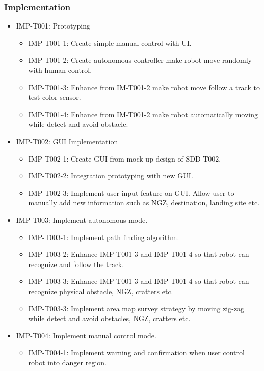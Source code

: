 	\subsubsection{Implementation}
	\begin{itemize}
		\item IMP-T001: Prototyping
		\begin{itemize}
				\item IMP-T001-1: Create simple manual control with UI.				
				\item IMP-T001-2: Create autonomous controller make robot move randomly with human control.
				\item IMP-T001-3: Enhance from IM-T001-2 make robot move follow a track to test color sensor.
				\item IMP-T001-4: Enhance from IM-T001-2 make robot automatically moving while detect and avoid obstacle. 
		\end{itemize}
		\item IMP-T002: GUI Implementation
		\begin{itemize}
				\item IMP-T002-1: Create GUI from mock-up design of SDD-T002.
				\item IMP-T002-2: Integration prototyping with new GUI.
				\item IMP-T002-3: Implement user input feature on GUI. Allow user to manually add new information such as NGZ, destination, landing site etc.
		\end{itemize}
		\item IMP-T003: Implement autonomous mode.
		\begin{itemize}
				\item IMP-T003-1: Implement path finding algorithm.
				\item IMP-T003-2: Enhance IMP-T001-3 and IMP-T001-4 so that robot can recognize and follow the track.
				\item IMP-T003-3: Enhance IMP-T001-3 and IMP-T001-4 so that robot can recognize physical obstacle, NGZ, cratters etc. 
				\item IMP-T003-3: Implement area map survey strategy by moving zig-zag while detect and avoid obstacles, NGZ, cratters etc.
		\end{itemize}
		\item IMP-T004: Implement manual control mode.
		\begin{itemize}
				\item IMP-T004-1: Implement warning and confirmation when user control robot into danger region.

\end{itemize}
\end{itemize}
